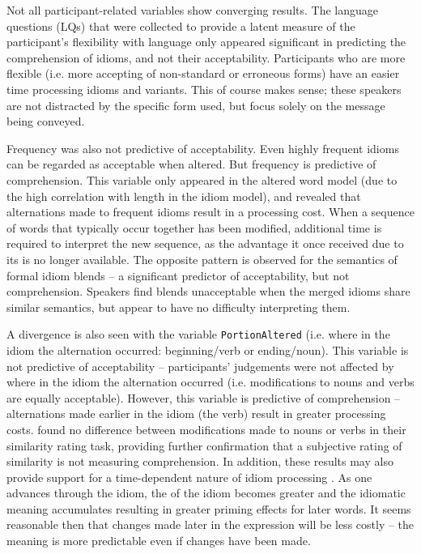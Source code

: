 \documentclass[output=paper,modfonts,nonflat]{langsci/langscibook}
\begin{document}
Not all participant-related variables show converging results. The language questions (LQs) that were collected to provide a latent measure of the participant's flexibility with language only appeared significant in predicting the comprehension of idioms, and not their acceptability. Participants who are more flexible (i.e. more accepting of non-standard or erroneous forms) have an easier time processing idioms and variants. This of course makes sense; these speakers are not distracted by the specific form used, but focus solely on the message being conveyed.  

Frequency was also not predictive of acceptability. Even highly frequent idioms can be regarded as acceptable when altered. But frequency is predictive of comprehension. This variable only appeared in the altered word model (due to the high correlation with length in the idiom model), and revealed that alternations made to frequent idioms result in a processing cost. When a sequence of words that typically occur together has been modified, additional time is required to interpret the new sequence, as the advantage it once received due to its  is no longer available. The opposite pattern is observed for the semantics of formal idiom blends -- a significant predictor of acceptability, but not comprehension. Speakers find blends unacceptable when the merged idioms share similar semantics, but appear to have no difficulty interpreting them.

A divergence is also seen with the variable \texttt{PortionAltered} (i.e. where in the idiom the alternation occurred: beginning/verb or ending/noun). This variable is not predictive of acceptability -- participants' judgements were not affected by where in the idiom the alternation occurred (i.e. modifications to nouns and verbs are equally acceptable). However, this variable is predictive of comprehension -- alternations made earlier in the idiom (the verb) result in greater processing costs. \citet{GibbsEtAl1989} found no difference between modifications made to nouns or verbs in their similarity rating task, providing further confirmation that a subjective rating of similarity is not measuring comprehension. In addition, these results may also provide support for a time-dependent nature of idiom processing \citep{TitoneLibben2014}. As one advances through the idiom, the  of the idiom becomes greater and the idiomatic meaning accumulates resulting in greater priming effects for later words. It seems reasonable then that changes made later in the expression will be less costly -- the meaning is more predictable even if changes have been made.
\end{document}
